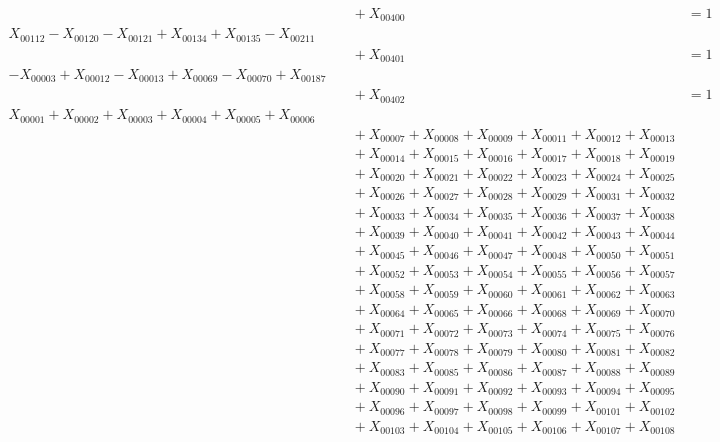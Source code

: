 \documentclass[a4paper,10pt]{article}
\begin{document}
{\begin{align}
&\quad  + X_{00400} &= 1 && \text{(R00169)} \\
X_{00112} - X_{00120} - X_{00121} + X_{00134} + X_{00135} - X_{00211} \\[0.5ex]
&\quad  + X_{00401} &= 1 && \text{(R00170)} \\
-X_{00003} + X_{00012} - X_{00013} + X_{00069} - X_{00070} + X_{00187} \\[0.5ex]
&\quad  + X_{00402} &= 1 && \text{(R00171)} \\
X_{00001} + X_{00002} + X_{00003} + X_{00004} + X_{00005} + X_{00006} \\[0.5ex]
&\quad  + X_{00007} + X_{00008} + X_{00009} + X_{00011} + X_{00012} + X_{00013} \\[0.5ex]
&\quad  + X_{00014} + X_{00015} + X_{00016} + X_{00017} + X_{00018} + X_{00019} \\[0.5ex]
&\quad  + X_{00020} + X_{00021} + X_{00022} + X_{00023} + X_{00024} + X_{00025} \\[0.5ex]
&\quad  + X_{00026} + X_{00027} + X_{00028} + X_{00029} + X_{00031} + X_{00032} \\[0.5ex]
&\quad  + X_{00033} + X_{00034} + X_{00035} + X_{00036} + X_{00037} + X_{00038} \\[0.5ex]
&\quad  + X_{00039} + X_{00040} + X_{00041} + X_{00042} + X_{00043} + X_{00044} \\[0.5ex]
&\quad  + X_{00045} + X_{00046} + X_{00047} + X_{00048} + X_{00050} + X_{00051} \\[0.5ex]
&\quad  + X_{00052} + X_{00053} + X_{00054} + X_{00055} + X_{00056} + X_{00057} \\[0.5ex]
&\quad  + X_{00058} + X_{00059} + X_{00060} + X_{00061} + X_{00062} + X_{00063} \\[0.5ex]
&\quad  + X_{00064} + X_{00065} + X_{00066} + X_{00068} + X_{00069} + X_{00070} \\[0.5ex]
&\quad  + X_{00071} + X_{00072} + X_{00073} + X_{00074} + X_{00075} + X_{00076} \\[0.5ex]
&\quad  + X_{00077} + X_{00078} + X_{00079} + X_{00080} + X_{00081} + X_{00082} \\[0.5ex]
&\quad  + X_{00083} + X_{00085} + X_{00086} + X_{00087} + X_{00088} + X_{00089} \\[0.5ex]
&\quad  + X_{00090} + X_{00091} + X_{00092} + X_{00093} + X_{00094} + X_{00095} \\[0.5ex]
&\quad  + X_{00096} + X_{00097} + X_{00098} + X_{00099} + X_{00101} + X_{00102} \\[0.5ex]
&\quad  + X_{00103} + X_{00104} + X_{00105} + X_{00106} + X_{00107} + X_{00108} \\[0.5ex]

\end{align}}
\end{document}
